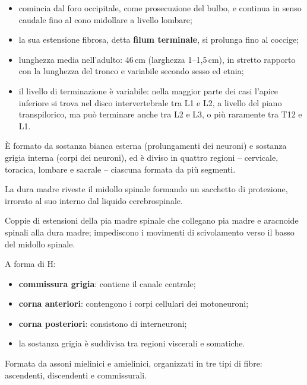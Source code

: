 \begin{itemize}
  \item comincia dal foro occipitale, come prosecuzione del bulbo, e continua
    in senso caudale fino al cono midollare a livello lombare;
  \item la sua estensione fibrosa, detta \textbf{filum terminale}, si
    prolunga fino al coccige;
  \item lunghezza media nell'adulto: 46\,cm (larghezza 1--1,5\,cm), in
    stretto rapporto con la lunghezza del tronco e variabile secondo sesso ed
    etnia;
  \item il livello di terminazione è variabile: nella maggior parte dei casi
    l'apice inferiore si trova nel disco intervertebrale tra L1 e L2, a
    livello del piano transpilorico, ma può terminare anche tra L2 e L3, o
    più raramente tra T12 e L1.
\end{itemize}

È formato da sostanza bianca esterna (prolungamenti dei neuroni) e sostanza
grigia interna (corpi dei neuroni), ed è diviso in quattro regioni --
cervicale, toracica, lombare e sacrale -- ciascuna formata da più segmenti.

La dura madre riveste il midollo spinale formando un sacchetto di protezione,
irrorato al suo interno dal liquido cerebrospinale.

Coppie di estensioni della pia madre spinale che collegano pia madre e
aracnoide spinali alla dura madre; impediscono i movimenti di scivolamento
verso il basso del midollo spinale.

A forma di H:
\begin{itemize}
  \item \textbf{commissura grigia}: contiene il canale centrale;
  \item \textbf{corna anteriori}: contengono i corpi cellulari dei
    motoneuroni;
  \item \textbf{corna posteriori}: consistono di interneuroni;
  \item la sostanza grigia è suddivisa tra regioni viscerali e somatiche.
\end{itemize}

Formata da assoni mielinici e amielinici, organizzati in tre tipi di fibre:
ascendenti, discendenti e commissurali.
